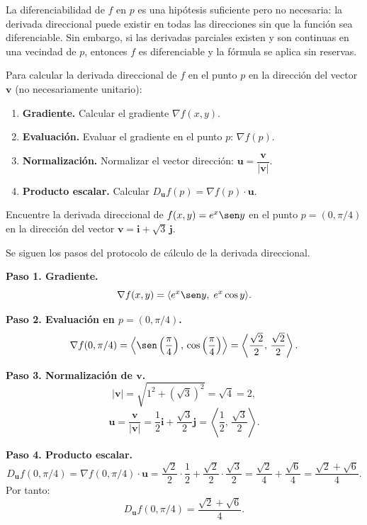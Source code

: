 \begin{rem}
La diferenciabilidad de $f$ en $p$ es una hipótesis suficiente pero no
necesaria: la derivada direccional puede existir en todas las direcciones
sin que la función sea diferenciable. Sin embargo, si las derivadas
parciales existen y son continuas en una vecindad de $p$, entonces $f$ es
diferenciable y la fórmula se aplica sin reservas.
\end{rem}

\begin{pasos}
Para calcular la derivada direccional de $f$ en el punto $p$ en la
dirección del vector $\mathbf{v}$ (no necesariamente unitario):
\begin{enumerate}
    \item \textbf{Gradiente.} Calcular el gradiente $\nabla f(x,y)$.
    \item \textbf{Evaluación.} Evaluar el gradiente en el punto $p$:
    $\nabla f(p)$.
    \item \textbf{Normalización.} Normalizar el vector dirección:
    $\mathbf{u} = \dfrac{\mathbf{v}}{|\mathbf{v}|}$.
    \item \textbf{Producto escalar.} Calcular
    $D_{\mathbf{u}} f(p) = \nabla f(p)\cdot \mathbf{u}$.
\end{enumerate}
\end{pasos}

\begin{example}
Encuentre la derivada direccional de $f(x,y) = e^x \sen y$ en el punto
$p = (0, \pi/4)$ en la dirección del vector $\mathbf{v} = \mathbf{i} +
\sqrt{3}\,\mathbf{j}$.
\begin{myproof}
Se siguen los pasos del protocolo de cálculo de la derivada direccional.

\textbf{Paso 1. Gradiente.}
\[
\nabla f(x,y) = \langle e^x \sen y,\; e^x \cos y \rangle.
\]

\textbf{Paso 2. Evaluación en $p=(0,\pi/4)$.}
\[
\nabla f(0,\pi/4)
= \left\langle \sen\left(\frac{\pi}{4}\right),\,
         \cos\left(\frac{\pi}{4}\right) \right\rangle
= \left\langle \frac{\sqrt{2}}{2},\, \frac{\sqrt{2}}{2} \right\rangle.
\]

\textbf{Paso 3. Normalización de $\mathbf{v}$.}
\[
|\mathbf{v}| = \sqrt{1^2 + (\sqrt{3})^2} = \sqrt{4} = 2,
\]
\[
\mathbf{u} = \frac{\mathbf{v}}{|\mathbf{v}|}
= \frac{1}{2}\mathbf{i} + \frac{\sqrt{3}}{2}\mathbf{j}
= \left\langle \frac{1}{2},\, \frac{\sqrt{3}}{2} \right\rangle.
\]

\textbf{Paso 4. Producto escalar.}
\[
D_{\mathbf{u}} f(0,\pi/4)
= \nabla f(0,\pi/4)\cdot \mathbf{u}
= \frac{\sqrt{2}}{2}\cdot\frac{1}{2}
  + \frac{\sqrt{2}}{2}\cdot\frac{\sqrt{3}}{2}
= \frac{\sqrt{2}}{4} + \frac{\sqrt{6}}{4}
= \frac{\sqrt{2}+\sqrt{6}}{4}.
\]
Por tanto:
\[
\boxed{D_{\mathbf{u}} f(0,\pi/4) = \frac{\sqrt{2}+\sqrt{6}}{4}}.
\]
\end{myproof}
\end{example}

